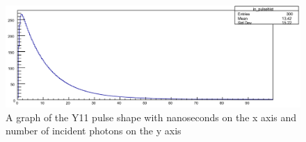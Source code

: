\begin{figure}
\centering
\includegraphics[width=\linewidth]{Figures/Y11.png}
\caption{A graph of the Y11 pulse shape with nanoseconds on the x axis and number of incident photons on the y axis}
\label{fig:Y11}
\end{figure}

